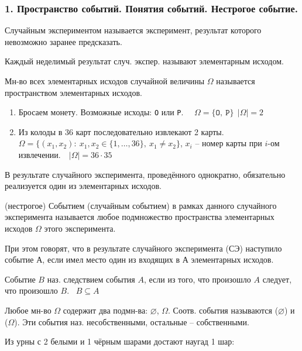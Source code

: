 
\subsubsection*{1. Пространство событий. Понятия событий. Нестрогое событие.}

\OPR Случайным экспериментом называется эксперимент, результат которого невозможно заранее предсказать.

\OPR Каждый неделимый результат случ. экспер. называют элементарным исходом.

\OPR Мн-во всех элементарных исходов случайной величины $\Omega$ называется пространством элементарных исходов.

\PRIM
\begin{enumerate}[topsep=0pt, leftmargin=18pt, noitemsep]
	\item Бросаем монету. Возможные исходы: \texttt{O} или \texttt{P}.~~ $\Omega = \{\texttt{O},~\texttt{P}\}~~|\Omega|=2$
	
	\item Из колоды в 36 карт последовательно извлекают 2 карты.~~ 
	$\Omega=\{(x_1,x_2):~x_1,x_2\in \{1,\dots,36\},~x_1\neq x_2\}$, $x_i$ -- 
	номер карты при $i$-ом извлечении.~~$|\Omega|=36\cdot 35$
\end{enumerate}

В результате случайного эксперимента, проведённого однократно, обязательно реализуется один из элементарных исходов.

\OPR (нестрогое) Событием (случайным событием) в рамках данного случайного эксперимента называется любое подмножество пространства элементарных исходов $\Omega$ этого эксперимента.

При этом говорят, что в результате случайного эксперимента (СЭ) наступило событие А, если имел место один из входящих в А элементарных исходов.

\OPR Событие $B$ наз. следствием события $A$, если из того, что произошло $A$ следует, что произошло $B$. ~$B\subseteq A$

\ZAM Любое мн-во $\Omega$ содержит два подмн-ва: $\varnothing$, $\Omega$. Соотв. события называются  ($\varnothing$) и  ($\Omega$). Эти события наз. несобственными, остальные -- собственными.

\PRIM Из урны с 2 белыми и 1 чёрным шарами достают наугад 1 шар:

